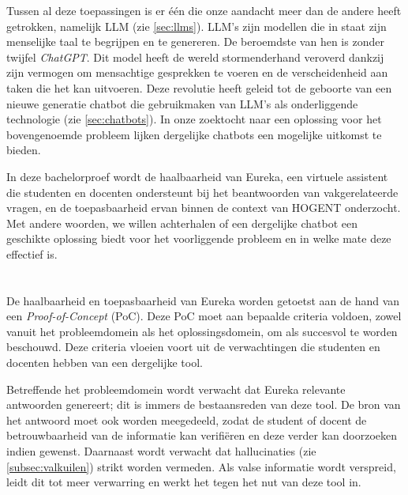 Tussen al deze toepassingen is er één die onze aandacht meer dan de andere heeft getrokken, namelijk \acrfull{LLM} (zie \ref{sec:llms}). \acrshort{LLM}'s zijn modellen die in staat zijn menselijke taal te begrijpen en te genereren. De beroemdste van hen is zonder twijfel \textit{\gls{ChatGPT}}. Dit model heeft de wereld stormenderhand veroverd dankzij zijn vermogen om mensachtige gesprekken te voeren en de verscheidenheid aan taken die het kan uitvoeren. Deze revolutie heeft geleid tot de geboorte van een nieuwe generatie chatbot die gebruikmaken van \acrshort{LLM}'s als onderliggende technologie (zie \ref{sec:chatbots}). In onze zoektocht naar een oplossing voor het bovengenoemde probleem lijken dergelijke chatbots een mogelijke uitkomst te bieden.

In deze bachelorproef wordt de haalbaarheid van Eureka, een virtuele assistent die studenten en docenten ondersteunt bij het beantwoorden van vakgerelateerde vragen, en de toepasbaarheid ervan binnen de context van HOGENT onderzocht. Met andere woorden, we willen achterhalen of een dergelijke chatbot een geschikte oplossing biedt voor het voorliggende probleem en in welke mate deze effectief is.
 
\section{}%
\label{sec:onderzoeksdoelstelling}


De haalbaarheid en toepasbaarheid van Eureka worden getoetst aan de hand van een \textit{Proof-of-Concept} (PoC). Deze PoC moet aan bepaalde criteria voldoen, zowel vanuit het probleemdomein als het oplossingsdomein, om als succesvol te worden beschouwd. Deze criteria vloeien voort uit de verwachtingen die studenten en docenten hebben van een dergelijke tool.

Betreffende het probleemdomein wordt verwacht dat Eureka relevante antwoorden genereert; dit is immers de bestaansreden van deze tool. De bron van het antwoord moet ook worden meegedeeld, zodat de student of docent de betrouwbaarheid van de informatie kan verifiëren en deze verder kan doorzoeken indien gewenst. Daarnaast wordt verwacht dat hallucinaties (zie \ref{subsec:valkuilen}) strikt worden vermeden. Als valse informatie wordt verspreid, leidt dit tot meer verwarring en werkt het tegen het nut van deze tool in.

